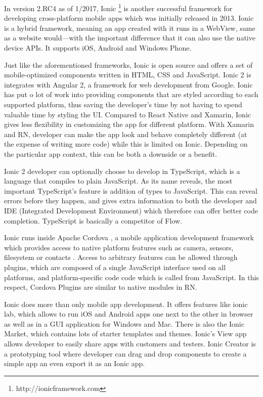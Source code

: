 In version 2.RC4 as of 1/2017, Ionic \footnote{http://ionicframework.com} is another successful framework for developing cross-platform mobile apps which was initially released in 2013. Ionic is a hybrid framework, meaning an app created with it runs in a WebView, same as a website would---with the important difference that it can also use the native device APIs. It supports iOS, Android and Windows Phone.

Just like the aforementioned frameworks, Ionic is open source and offers a set of mobile-optimized components written in HTML, CSS and JavaScript. Ionic 2 is integrates with Angular 2, a framework for web development from Google. Ionic has put o lot of work into providing components that are styled according to each supported platform, thus saving the developer's time by not having to spend valuable time by styling the UI. Compared to React Native and Xamarin, Ionic gives less flexibility in customizing the app for different platform. With Xamarin and RN, developer can make the app look and behave completely different (at the expense of writing more code) while this is limited on Ionic. Depending on the particular app context, this can be both a downside or a benefit.

Ionic 2 developer can optionally choose to develop in TypeScript, which is a language that compiles to plain JavaScript. As its name reveals, the most important TypeScript's feature is addition of types to JavaScript. This can reveal errors before they happen, and gives extra information to both the developer and IDE (Integrated Development Environment) which therefore can offer better code completion. TypeScript is basically a competitor of Flow.

Ionic runs inside Apache Cordova \cite{ionic:cordova}, a mobile application development framework which provides access to native platform features such as camera, sensors, filesystem or contacts \cite{cordova:intro}. Access to arbitrary features can be allowed through plugins, which are composed of a single JavaScript interface used on all platforms, and platform-specific code code which is called from JavaScript. In this respect, Cordova Plugins are similar to native modules in RN.

Ionic does more than only mobile app development. It offers features like ionic lab, which allows to run iOS and Android apps one next to the other in browser as well as in a GUI application for Windows and Mac. There is also the Ionic Market, which contains lots of starter templates and themes. Ionic's View app allows developer to easily share apps with customers and testers. Ionic Creator is a prototyping tool where developer can drag and drop components to create a simple app an even export it as an Ionic app.

